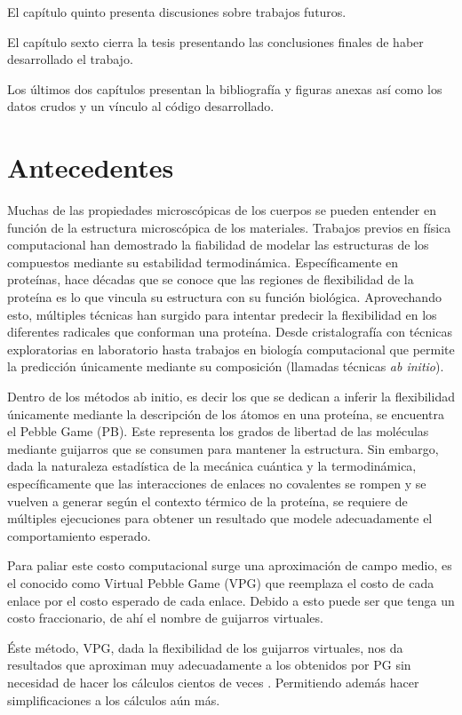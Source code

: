 El capítulo quinto presenta discusiones sobre trabajos futuros.

El capítulo sexto cierra la tesis presentando las conclusiones finales de haber desarrollado el trabajo.

Los últimos dos capítulos presentan la bibliografía y figuras anexas así como los datos crudos y un vínculo al código desarrollado. 

\section{Antecedentes}
Muchas de las propiedades microscópicas de los cuerpos se pueden entender en función de la estructura microscópica\parencite{Jacobs97analgorithm} de los materiales. Trabajos previos en física computacional han demostrado la fiabilidad de modelar las estructuras de los compuestos mediante su estabilidad termodinámica. Específicamente en proteínas, hace décadas que se conoce que las regiones de flexibilidad de la proteína es lo que vincula su estructura con su función biológica\parencite{Gerstein1994}.
Aprovechando esto, múltiples técnicas han surgido para intentar predecir la flexibilidad en los diferentes radicales que conforman una proteína. Desde cristalografía con técnicas exploratorias en laboratorio hasta trabajos en biología computacional que permite la predicción únicamente mediante su composición (llamadas técnicas \emph{ab initio}).

Dentro de los métodos ab initio, es decir los que se dedican a inferir la flexibilidad únicamente mediante la descripción de los átomos en una proteína, se encuentra el Pebble Game (PB)\parencite{Jacobs97analgorithm}. Este representa los grados de libertad de las moléculas mediante guijarros que se consumen para mantener la estructura. Sin embargo, dada la naturaleza estadística de la mecánica cuántica y la termodinámica, específicamente que las interacciones de enlaces no covalentes se rompen y se vuelven a generar según el contexto térmico de la proteína, se requiere de múltiples ejecuciones para obtener un resultado que modele adecuadamente el comportamiento esperado.

Para paliar este costo computacional surge una aproximación de campo medio, es el conocido como Virtual Pebble Game (VPG)\parencite{Gonzalez2011} que reemplaza el costo de cada enlace por el costo esperado de cada enlace. Debido a esto puede ser que tenga un costo fraccionario, de ahí el nombre de guijarros virtuales.

Éste método, VPG, dada la flexibilidad de los guijarros virtuales, nos da resultados que aproximan muy adecuadamente a los obtenidos por PG sin necesidad de hacer los cálculos cientos de veces \parencite{Gonzalez2011}. Permitiendo además hacer simplificaciones a los cálculos aún más. 

